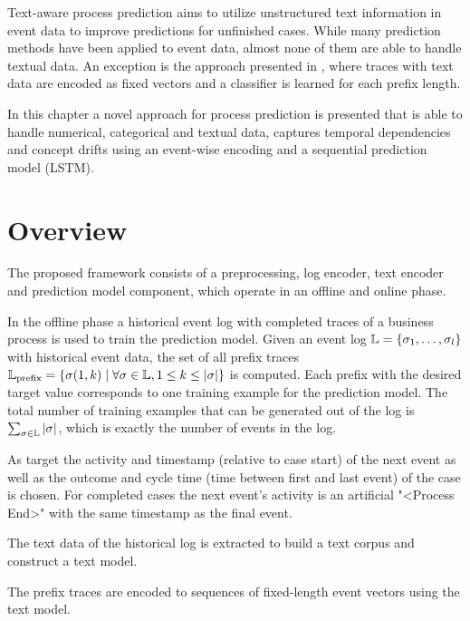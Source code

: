 Text-aware process prediction aims to utilize unstructured text information in event data to improve predictions for unfinished cases.
While many prediction methods have been applied to event data, almost none of them are able to handle textual data.
An exception is the approach presented in \cite{DBLP:conf/bpm/TeinemaaDMF16}, where traces with text data are encoded as fixed vectors and a classifier is learned for each prefix length.

In this chapter a novel approach for process prediction is presented that is able to handle numerical, categorical and textual data, captures temporal dependencies and concept drifts using an event-wise encoding and a sequential prediction model (LSTM).

\section{Overview}

The proposed framework consists of a preprocessing, log encoder, text encoder and prediction model component, which operate in an offline and online phase.

In the offline phase a historical event log with completed traces of a business process is used to train the prediction model.
Given an event log $\mathbb{L} = \{\sigma_1, \dots, \sigma_l\}$ with historical event data, the set of all prefix traces $\mathbb{L}_\mathrm{prefix} = \{\sigma(1,k) \mid \forall \sigma \in \mathbb{L}, 1 \leq k \leq |\sigma|\}$ is computed.
Each prefix with the desired target value corresponds to one training example for the prediction model.
The total number of training examples that can be generated out of the log is $\sum_{\sigma \in \mathbb{L}}|\sigma|$, which is exactly the number of events in the log.

As target the activity and timestamp (relative to case start) of the next event as well as the outcome and cycle time (time between first and last event) of the case is chosen.
For completed cases the next event's activity is an artificial "<Process End>" with the same timestamp as the final event.

The text data of the historical log is extracted to build a text corpus and construct a text model.

The prefix traces are encoded to sequences of fixed-length event vectors using the text model.




